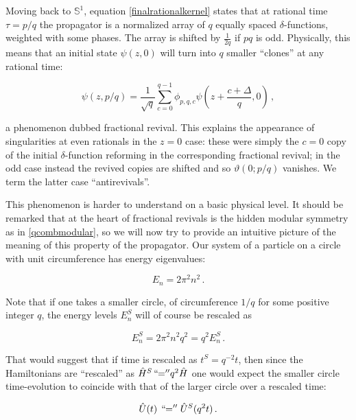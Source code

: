 \documentclass{article}
\newcommand{\T}{\ensuremath{\vartheta}}
\begin{document}
Moving back to $\mathbb{S}^1$, equation \eqref{finalrationalkernel} states that at rational time $\tau = p/q$ the propagator is a normalized array of $q$ equally spaced $\delta$-functions, weighted with some phases. The array is shifted by $\frac{1}{2q}$ if $pq$ is odd. Physically, this means that an initial state $\psi(z,0)$ will turn into $q$ smaller ``clones'' at any rational time:

\begin{equation}
    \psi(z,p/q) = \frac{1}{\sqrt q} \sum_{c=0}^{q-1} \phi_{p,q,c} \psi\left(z + \frac{c+\Delta}{q},0\right)\,,
\end{equation}

a phenomenon dubbed fractional revival. This explains the appearance of singularities at even rationals in the $z=0$ case: these were simply the $c=0$ copy of the initial $\delta$-function reforming in the corresponding fractional revival; in the odd case instead the revived copies are shifted and so $\T(0;p/q)$ vanishes. We term the latter case ``antirevivals''.

This phenomenon is harder to understand on a basic physical level. It should be remarked that at the heart of fractional revivals is the hidden modular symmetry as in \eqref{qcombmodular}, so we will now try to provide an intuitive picture of the meaning of this property of the propagator. Our system of a particle on a circle with unit circumference has energy eigenvalues:

\begin{equation}
    E_n = 2\pi^2 n^2\,.
\end{equation}

Note that if one takes a smaller circle, of circumference $1/q$ for some positive integer $q$, the energy levels $E^{S}_n$ will of course be rescaled as

\begin{equation}
    E^{S}_n = 2\pi^2 n^2 q^2 = q^2 E^{S}_n\,.
\end{equation}

\newcommand{\aqeq}{\ensuremath{{\,``\!\!=''}}}

That would suggest that if time is rescaled as $t^{S} = q^{-2} t$, then since the Hamiltonians are ``rescaled'' as $\hat{H}^S \aqeq q^2 \hat H$ one would expect the smaller circle time-evolution to coincide with that of the larger circle over a rescaled time:

\begin{equation}
    \hat{U}(t)\; \aqeq \; \hat{U}^{S}(q^2 t)\,.
\end{equation}
\end{document}

